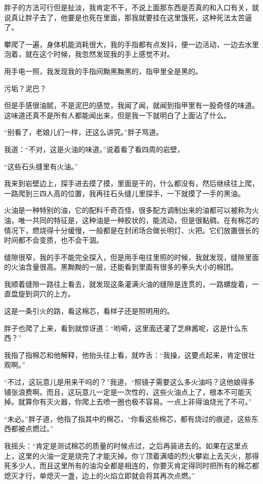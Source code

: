 胖子的方法可行但是扯淡，我肯定不干，不说上面那东西是否真的和入口有关，就说真让胖子去了，他要是也死在里面，那我就要挂在这里饿死，这种死法太苦逼了。

攀爬了一遍，身体机能消耗很大，我的手指都有点发抖，便一边活动，一边去水里泡着，就在这个时候，我忽然发现我的手上感觉不对。

用手电一照，我发现我的手指间黝黑黝黑的，指甲里全是黑的。

污垢？泥巴？

但是手感很油腻，不是泥巴的感觉，我闻了闻，就闻到指甲里有一股奇怪的味道。这味道还真不是所有人都能闻出来，但是我一下就明白了上面沾了什么。

“别看了，老娘儿们一样，还这么讲究。”胖子骂道。

我道：“不对，这是火油的味道。”说着看了看四周的岩壁，

“这些石头缝里有火油。”

我来到岩壁边上，探手进去摸了摸，里面是干的，什么都没有，然后继续往上爬，一路爬到三四人高的位置，我再往石头缝儿里探手，一下就摸了一手的黑油。

火油是一种特别的油，它的配料千奇百怪，很多配方调制出来的油都可以被称为火油，唯一共同的特征是，这种油是一种胶状的，能流动，但是很黏稠。在有棉芯的情况下，燃烧得十分缓慢，一般都是在封闭场合做长明灯、火把。它们放置很长的时间都不会变质，也不会干涸。

缝隙很窄，我的手不能完全探入，但是用手电往里照的时候，我就发现，缝隙里面的火油含量很高。黑黝黝的一层，还能看到里面有很多的拳头大小的棉团。

我顺着缝隙一路往上看去，就发现这条灌满火油的缝隙是连贯的，一路螺旋着，一直盘旋到洞穴的上方。

这是一条引火的路，看这棉芯，看样子还是照明用的。

胖子也爬了上来，看到就惊讶道：“哟嗬，这里面还灌了芝麻酱呢，这是什么东西？”

我指了指棉芯和他解释，他抬头往上看，就咋舌：“我操，这要点起来，肯定很壮观啊。”

“不过，这玩意儿是用来干吗的？”我道，“照镜子需要这么多火油吗？这他娘得多铺张浪费啊。而且，这玩意儿一定是一次性的，这些火油点上了，根本不可能灭掉。就算你有灭火器，你爬上去喷一圈也极不容易。一点上非得油烧光了不可。”

“未必。”胖子道，他指了指其中的棉芯，“你看这些棉芯，都有烧过的痕迹，这些东西都被点燃过。”

我摇头：“肯定是测试棉芯的质量的时候点过，之后再装进去的。如果在这里点上，这里的火油一定是烧完了才能灭掉。你丫顶着满墙的烈火攀岩上去灭火，那得死多少人，而且这里所有的油沟全都是相连的，你要灭肯定得同时把所有的棉芯都熄灭才行，单熄灭一盏，边上的火焰立即就会将其再次点燃。”

